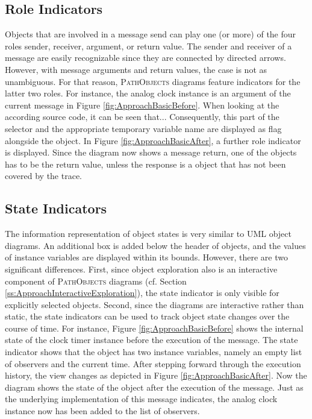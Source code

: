 \subsection{Role Indicators}
\label{ss:ApproachNotationRoles}
Objects that are involved in a message send can play one (or more) of the four roles sender, receiver, argument, or return value.
The sender and receiver of a message are easily recognizable since they are connected by directed arrows.
However, with message arguments and return values, the case is not as unambiguous.
For that reason, \textsc{PathObjects} diagrams feature indicators for the latter two roles.
For instance, the analog clock instance is an argument of the current message in Figure \ref{fig:ApproachBasicBefore}.
When looking at the according source code, it can be seen that...
Consequently, this part of the selector and the appropriate temporary variable name are displayed as flag alongside the object.
In Figure \ref{fig:ApproachBasicAfter}, a further role indicator is displayed.
Since the diagram now shows a message return, one of the objects has to be the return value, unless the response is a object that has not been covered by the trace.

\subsection{State Indicators}
\label{ss:ApproachNotationState}
The information representation of object states is very similar to UML object diagrams.
An additional box is added below the header of objects, and the values of instance variables are displayed within its bounds.
However, there are two significant differences.
First, since object exploration also is an interactive component of \textsc{PathObjects} diagrams (cf. Section \ref{ss:ApproachInteractiveExploration}), the state indicator is only visible for explicitly selected objects.
Second, since the diagrams are interactive rather than static, the state indicators can be used to track object state changes over the course of time.
For instance, Figure \ref{fig:ApproachBasicBefore} shows the internal state of the clock timer instance before the execution of the  message.
The state indicator shows that the object has two instance variables, namely an empty list of observers and the current time.
After stepping forward through the execution history, the view changes as depicted in Figure \ref{fig:ApproachBasicAfter}.
Now the diagram shows the state of the object after the execution of the  message.
Just as the underlying implementation of this message indicates, the analog clock instance now has been added to the list of observers.

